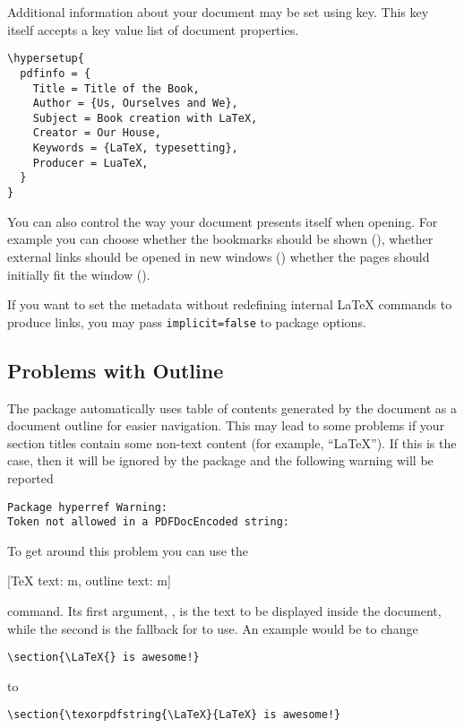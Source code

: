 Additional information about your document may be set using 
key. This key itself accepts a key value list of document properties.
\begin{verbatim}
\hypersetup{
  pdfinfo = {
    Title = Title of the Book,
    Author = {Us, Ourselves and We},
    Subject = Book creation with LaTeX,
    Creator = Our House,
    Keywords = {LaTeX, typesetting},
    Producer = LuaTeX,
  }
}
\end{verbatim}

You can also control the way your document presents itself when opening. For
example you can choose whether the bookmarks should be shown
(), whether external links should be opened in new windows
() whether the pages should initially fit the window
().

If you want to set the metadata without redefining internal \LaTeX{} commands
to produce links, you may pass \texttt{implicit=false} to
 package options.
\endgroup

\subsection{Problems with Outline}

The  package automatically uses table of contents generated by
the document as a document outline for easier navigation. This may lead to some
problems if your section titles contain some non-text content (for example,
\enquote{\LaTeX}). If this is the case, then it will be ignored by the
package and the following warning will be reported
\begin{code}
\begin{verbatim}
Package hyperref Warning:
Token not allowed in a PDFDocEncoded string:
\end{verbatim}
\end{code}
To get around this problem you can use the
\begin{lscommand}
  [\bs TeX{} text: m, outline text: m]
\end{lscommand}
command. Its first argument, , is the text to be displayed
inside the document, while the second is the fallback for  to
use. An example would be to change
\begin{verbatim}
\section{\LaTeX{} is awesome!}
\end{verbatim}
to
\begin{verbatim}
\section{\texorpdfstring{\LaTeX}{LaTeX} is awesome!}
\end{verbatim}

